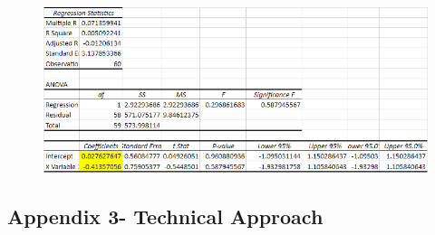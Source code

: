 \documentclass{article}
\let\Oldsubsection\subsection
\renewcommand{\subsection}{\FloatBarrier\Oldsubsection}
\begin{document}
\begin{figure}[h!]
    \centering
    \includegraphics[scale=0.5]{graphs/appendix2-FunReg.png}
\end{figure}


\break


\subsection*{Appendix 3- Technical Approach}
\end{document}
